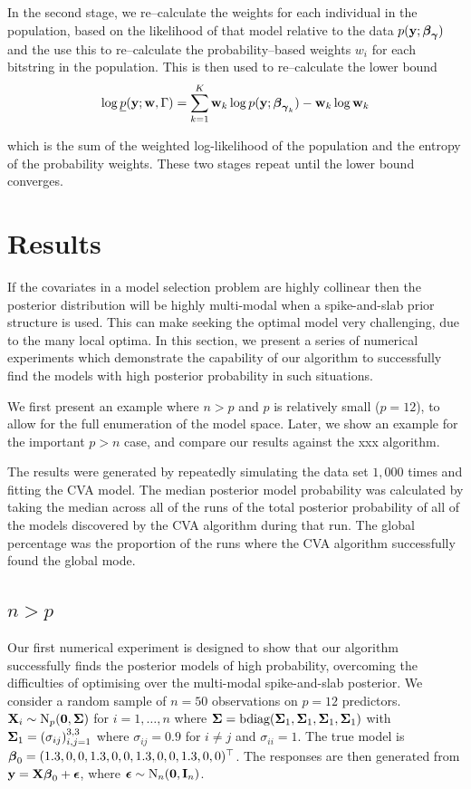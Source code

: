 \documentclass{amsart}[12pt]
\begin{document}
In the second stage, we re--calculate the weights for each individual in the population, based on the
likelihood of that model relative to the data $p({\bf y}; {\boldsymbol \beta}_{\boldsymbol \gamma})$ and the use this to re--calculate the
probability--based weights $w_i$ for each bitstring in the population. This is then used to re--calculate the
lower bound
\[
	\log \underline{p}({\bf y}; {\bf w}, \Gamma) = \sum_{k=1}^K {\bf w}_k \log p({\bf y}; {\boldsymbol \beta}_{{\boldsymbol \gamma}_k}) - {\bf w}_k \log {\bf w}_k
\]

which is the sum of the weighted log-likelihood of the population and the entropy of the probability weights.
These two stages repeat until the lower bound converges.

\section{Results}

If the covariates in a model selection problem are highly collinear then the posterior distribution will be
highly multi-modal when a spike-and-slab prior structure is used. This can make seeking the optimal model very
challenging, due to the many local optima. In this section, we present a series of numerical experiments which
demonstrate the capability of our algorithm to successfully find the models with high posterior probability in
such situations.

We first present an example where $n > p$ and $p$ is relatively small ($p = 12$), to allow for the full 
enumeration of the model space. Later, we show an example for the important $p > n$ case, and compare our results 
against the xxx algorithm.

The results were generated by repeatedly simulating the data set $1,000$ times and fitting the CVA model.
The median posterior model probability was calculated by taking the median across all of the runs of the
total posterior probability of all of the models discovered by the CVA algorithm during that run. The global
percentage was the proportion of the runs where the CVA algorithm successfully found the global mode.

\subsection{$n > p$}

Our first numerical experiment is designed to show that our algorithm successfully finds the posterior models
of high probability, overcoming the difficulties of optimising over the multi-modal spike-and-slab posterior.
We consider a random sample of $n = 50$ observations on $p = 12$ predictors. ${\bf X}_i \sim \text{N}_p({\bf 0}, {\boldsymbol \Sigma})$
for $i = 1, \ldots, n$ where
${\boldsymbol \Sigma} = \text{bdiag}({\boldsymbol \Sigma}_1, {\boldsymbol \Sigma}_1, {\boldsymbol \Sigma}_1, {\boldsymbol \Sigma}_1)$ with
${\boldsymbol \Sigma}_1 = (\sigma_{ij})_{i, j = 1}^{3, 3}$ where $\sigma_{ij} = 0.9$ for $i \ne j$ and $\sigma_{ii} = 1$.
The true model is ${\boldsymbol \beta}_0 = (1.3, 0, 0, 1.3, 0, 0, 1.3, 0, 0, 1.3, 0, 0)^\top$.
The responses are then generated from ${\bf y} = {\bf X} {\boldsymbol \beta}_0 + {\boldsymbol \epsilon}$, where
${\boldsymbol \epsilon} \sim \text{N}_n({\bf 0}, {\bf I}_n)$.
\end{document}
